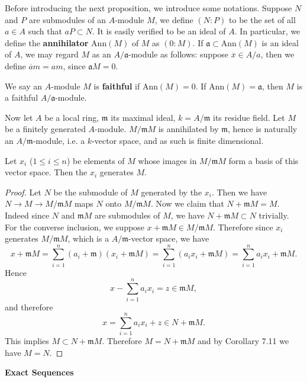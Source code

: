 Before introducing the next proposition, we introduce some notations. Suppose $N$ and $P$ are submodules of an $A$-module $M$, we define $(N:P)$ to be the set of all $a\in A$ such that $aP\subset N$. It is easily verified to be an ideal of $A$. In particular, we define the \textbf{annihilator} $\mathrm{Ann}(M)$ of $M$ as $(0:M)$. If $\mathfrak{a}\subset\mathrm{Ann}(M)$ is an ideal of $A$, we may regard $M$ as an $A/\mathfrak{a}$-module as follows: suppose $\overline{x}\in A/a$, then we define $\overline{a}m=am$, since $\mathfrak{a}M=0$.\par
We say an $A$-module $M$ is \textbf{faithful} if $\mathrm{Ann}(M)=0$. If $\mathrm{Ann}(M)=\mathfrak{a}$, then $M$ is a faithful $A/\mathfrak{a}$-module.\par
Now let $A$ be a local ring, $\mathfrak{m}$ its maximal ideal, $k=A/\mathfrak{m}$ its residue field. Let $M$ be a finitely generated $A$-module. $M/\mathfrak{m}M$ is annihilated by $\mathfrak{m}$, hence is naturally an $A/\mathfrak{m}$-module, i.e. a $k$-vector space, and as such is finite dimensional.
\begin{proposition}
Let $x_i$ ($1\le i\le n$) be elements of $M$ whose images in $M/\mathfrak{m}M$ form a basis of this vector space. Then the $x_i$ generates $M$.
\end{proposition}
\begin{proof}
Let $N$ be the submodule of $M$ generated by the $x_i$. Then we have $N\longrightarrow M\longrightarrow M/\mathfrak{m}M$ maps $N$ onto $M/\mathfrak{m}M$. Now we claim that $N+\mathfrak{m}M=M$. Indeed since $N$ and $\mathfrak{m}M$ are submodules of $M$, we have $N+\mathfrak{m}M\subset N$ trivially. For the converse inclusion, we suppose $x+\mathfrak{m}M\in M/\mathfrak{m}M$. Therefore since $x_i$ generates $M/\mathfrak{m}M$, which is a $A/\mathfrak{m}$-vector space, we have 
$$
x+\mathfrak{m} M=\sum_{i=1}^n{\left( a_i+\mathfrak{m} \right) \left( x_i+\mathfrak{m} M \right)}=\sum_{i=1}^n{\left( a_ix_i+\mathfrak{m} M \right)}=\sum_{i=1}^n{a_ix_i}+\mathfrak{m} M.
$$
Hence 
$$
x-\sum_{i=1}^n{a_ix_i}=z\in \mathfrak{m} M,
$$
and therefore 
$$
x=\sum_{i=1}^n{a_ix_i}+z\in N+\mathfrak{m} M.
$$
This implies $M\subset N+\mathfrak{m}M$. Therefore $M=N+\mathfrak{m}M$ and by Corollary 7.11 we have $M=N$.
\end{proof}
\begin{center}
\begin{large}
    \textbf{Exact Sequences}
\end{large}
\end{center}
